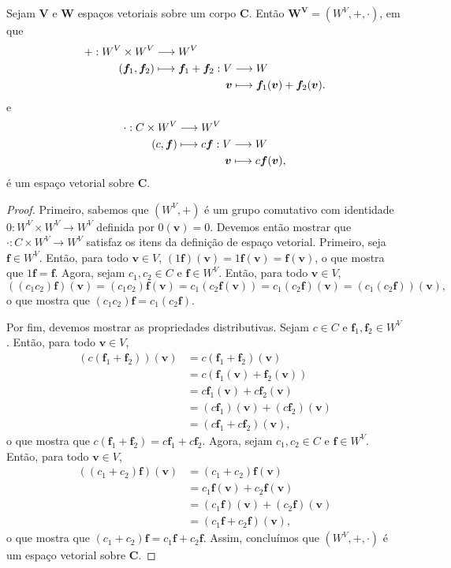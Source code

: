 \begin{prop}
Sejam $\bm V$ e $\bm W$ espaços vetoriais sobre um corpo $\bm C$. Então $\bm{W^V}=(W^V,+,\cdot)$, em que
	\begin{align*}
	{+}: {W^V \times W^V} &\longrightarrow {W^V} \\{(\bm f_1,\bm f_2)} &\longmapsto {
		\begin{aligned}[t]
		 {\bm f_1+\bm f_2}: {V} &\longrightarrow{W} \\{\bm v} &\longmapsto{\bm f_1(\bm v)+\bm f_2(\bm v).} 
		\end{aligned}
	}
	\end{align*}
e
\begin{align*}
	{\cdot}: {C \times W^V} &\longrightarrow {W^V} \\{(c,\bm f)} &\longmapsto {
		\begin{aligned}[t]
		 {c\bm f}: {V} &\longrightarrow{W} \\{\bm v} &\longmapsto{c\bm f(\bm v),} 
		\end{aligned}
	}
	\end{align*}
é um espaço vetorial sobre $\bm C$.
\end{prop}
\begin{proof}
Primeiro, sabemos que $(W^V,+)$ é um grupo comutativo com identidade $0: W^V \times W^V \to W^V$ definida por $0(\bm v)=0$. Devemos então mostrar que $\cdot: C \times W^V \to W^V$ satisfaz os itens da definição de espaço vetorial. Primeiro, seja $\bm f \in W^V$. Então, para todo $\bm v \in V$, $(1\bm f)(\bm v)=1\bm f(\bm v)=\bm f(\bm v)$, o que mostra que $1\bm f=\bm f$. Agora, sejam $c_1,c_2 \in C$ e $\bm f \in W^V$. Então, para todo $\bm v \in V$,
	\begin{equation*}
	((c_1c_2)\bm f)(\bm v) = (c_1c_2)\bm f(\bm v) = c_1(c_2\bm f(\bm v)) = c_1(c_2\bm f)(\bm v) = (c_1(c_2\bm f))(\bm v),
	\end{equation*}
o que mostra que $(c_1c_2)\bm f=c_1(c_2\bm f)$.

Por fim, devemos mostrar as propriedades distributivas. Sejam $c \in C$ e $\bm f_1,\bm f_2 \in W^V$. Então, para todo $\bm v \in V$,
	\begin{align*}
	(c(\bm f_1+\bm f_2))(\bm v)&=c(\bm f_1+\bm f_2)(\bm v) \\
	&=c(\bm f_1(\bm v)+\bm f_2(\bm v)) \\
	&= c\bm f_1(\bm v)+c \bm f_2(\bm v) \\
	&= (c\bm f_1)(\bm v)+(c \bm f_2)(\bm v) \\
	&=(c\bm f_1+c \bm f_2)(\bm v),
	\end{align*}
o que mostra que $c(\bm f_1+\bm f_2)=c\bm f_1+c \bm f_2$. Agora, sejam $c_1,c_2 \in C$ e $\bm f \in W^V$. Então, para todo $\bm v \in V$,
	\begin{align*}
	((c_1+c_2)\bm f)(\bm v) &= (c_1+c_2) \bm f(\bm v) \\
	&=c_1\bm f(\bm v)+c_2\bm f(\bm v) \\
	&=(c_1\bm f)(\bm v)+(c_2\bm f)(\bm v) \\
	&=(c_1\bm f+c_2\bm f)(\bm v),
	\end{align*}
o que mostra que $(c_1+c_2)\bm f=c_1\bm f+c_2\bm f$. Assim, concluímos que $(W^V,+,\cdot)$ é um espaço vetorial sobre $\bm C$.
\end{proof}

